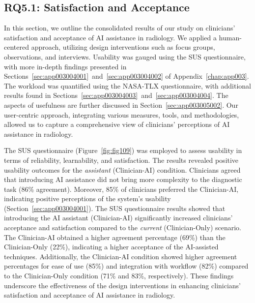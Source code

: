 \subsection{RQ5.1: Satisfaction and Acceptance}
\label{sec:chap005006001}

In this section, we outline the consolidated results of our study on clinicians' satisfaction and acceptance of \ac{AI} assistance in radiology.
We applied a human-centered approach, utilizing design interventions such as focus groups, observations, and interviews.
Usability was gauged using the \ac{SUS} questionnaire, with more in-depth findings presented in Sections~\ref{sec:app003004001}~and~\ref{sec:app003004002} of Appendix~\ref{chap:app003}.
The workload was quantified using the \ac{NASA-TLX} questionnaire, with additional results found in Sections~\ref{sec:app003004003}~and~\ref{sec:app003004004}.
The aspects of usefulness are further discussed in Section~\ref{sec:app003005002}.
Our user-centric approach, integrating various measures, tools, and methodologies, allowed us to capture a comprehensive view of clinicians' perceptions of \ac{AI} assistance in radiology.

The \ac{SUS} questionnaire (Figure~\ref{fig:fig109}) was employed to assess usability in terms of reliability, learnability, and satisfaction.
The results revealed positive usability outcomes for the {\it assistant} (Clinician-AI) condition.
Clinicians agreed that introducing \ac{AI} assistance did not bring more complexity to the diagnostic task (86\% agreement).
Moreover, 85\% of clinicians preferred the Clinician-AI, indicating positive perceptions of the system's usability (Section~\ref{sec:app003004001}).
The \ac{SUS} questionnaire results showed that introducing the \ac{AI} assistant (Clinician-AI) significantly increased clinicians' acceptance and satisfaction compared to the {\it current} (Clinician-Only) scenario.
The Clinician-AI obtained a higher agreement percentage (69\%) than the Clinician-Only (22\%), indicating a higher acceptance of the \ac{AI}-assisted techniques.
Additionally, the Clinician-AI condition showed higher agreement percentages for ease of use (85\%) and integration with workflow (82\%) compared to the Clinician-Only condition (71\% and 83\%, respectively).
These findings underscore the effectiveness of the design interventions in enhancing clinicians' satisfaction and acceptance of AI assistance in radiology.

